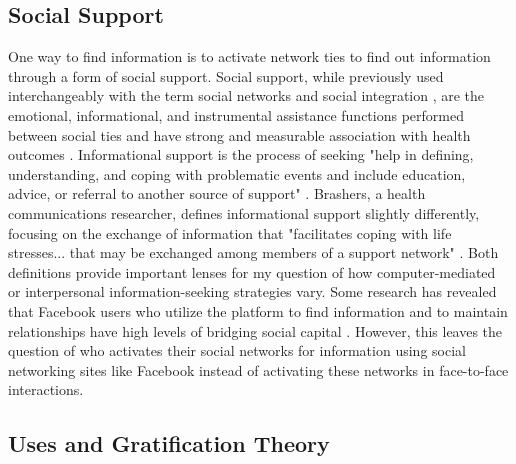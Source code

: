 \subsection{Social Support}

One way to find information is to activate network ties to find out information
through a form of social support. Social support, while previously used
interchangeably with the term social networks and social integration
\citep{houseStructuresProcessesSocial1988}, are the emotional, informational,
and instrumental assistance functions performed between social ties and have
strong and measurable association with health outcomes
\citep{houseMeasuresConceptsSocial1985, thoitsMechanismsLinkingSocial2011}.
Informational support is the process of seeking "help in defining,
understanding, and coping with problematic events and include education, advice,
or referral to another source of support" \citep[p. 640]{winemiller_etal93}.
Brashers, a health communications researcher, defines informational support
slightly differently, focusing on the exchange of information that "facilitates
coping with life stresses... that may be exchanged among members of a support
network" \citeyearpar[p. 260]{brashersInformationSeekingAvoiding2002}. Both
definitions provide important lenses for my question of how
computer-mediated or interpersonal information-seeking strategies vary. 
Some research has revealed that Facebook users who utilize the platform to 
find information and to maintain relationships have high levels of bridging
social capital \citep{liu2016meta}. However, this leaves the question 
of who activates their social networks for information using social networking 
sites like Facebook instead of activating these networks in face-to-face
interactions. 


\subsection{Uses and Gratification Theory}

